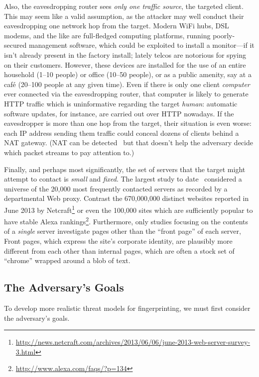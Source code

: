 Also, the eavesdropping router sees \emph{only one traffic source},
the targeted client.  This may seem like a valid assumption, as the
attacker may well conduct their eavesdropping one network hop from the
target.  Modern WiFi hubs, DSL modems, and the like are full-fledged
computing platforms, running poorly-secured management software, which
could be exploited to install a monitor---if it isn't already present
in the factory install; lately telcos are notorious for spying on
their customers.  However, these devices are installed
for the use of an entire household (1--10 people) or office (10--50
people), or as a public amenity, say at a café (20--100 people at any
given time).  Even if there is only one client \emph{computer} ever
connected via the eavesdropping router, that computer is likely to
generate HTTP traffic which is uninformative regarding the target
\emph{human}: automatic software updates, for instance, are carried
out over HTTP nowadays.  If the eavesdropper is more than one hop from
the target, their situation is even worse: each IP address sending
them traffic could conceal dozens of clients behind a NAT gateway.
(NAT can be detected~\cite{elie2005timestamp,krmivcek2009netflow} but
that doesn't help the adversary decide which packet streams to pay
attention to.)

Finally, and perhaps most significantly, the set of servers that the
target might attempt to contact is \emph{small} and \emph{fixed}.  The
largest study to date~ considered a universe of the
20,000 most frequently contacted servers as recorded by a departmental
Web proxy.  Contrast the 670,000,000 distinct websites reported in
June 2013 by
Netcraft\footnote{\url{http://news.netcraft.com/archives/2013/06/06/june-2013-web-server-survey-3.html}}
or even the 100,000 sites which are sufficiently popular to have
stable Alexa rankings\footnote{\url{http://www.alexa.com/faqs/?p=134}}.
Furthermore, only studies focusing on the contents of a \emph{single}
server investigate pages other than the “front page” of each server,
Front pages, which express the site's corporate identity, are
plausibly more different from each other than internal pages, which
are often a stock set of “chrome” wrapped around a blob of text.

\subsection{The Adversary's Goals}

To develop more realistic threat models for fingerprinting, we must
first consider the adversary's goals.    
